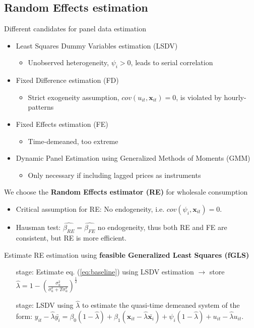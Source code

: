 \subsection{Random Effects estimation}
\label{subsec:e_re}
Different candidates for panel data estimation
\begin{itemize}
    \item Least Squares Dummy Variables estimation (LSDV)
    \begin{itemize}
        \item Unobserved heterogeneity, $\psi_i>0$, leads to serial correlation
    \end{itemize}
    \item Fixed Difference estimation (FD)
    \begin{itemize}
        \item Strict exogeneity assumption, $cov(u_{it},\bm{x}_{it})=0$, is violated by hourly-patterns
    \end{itemize}
    \item Fixed Effects estimation (FE)
    \begin{itemize}
        \item Time-demeaned, too extreme
    \end{itemize}
    \item Dynamic Panel Estimation using Generalized Methods of Moments (GMM)
    \begin{itemize}
        \item Only necessary if including lagged prices as instruments
    \end{itemize}
\end{itemize}
We choose the \textbf{Random Effects estimator (RE)} for wholesale consumption
\begin{itemize}
    \item Critical assumption for RE: No endogeneity, i.e. $cov(\psi_i,\bm{x}_{it})=0$.
    \item Hausman test: $\hat{\beta_{RE}}=\hat{\beta_{FE}}$ no endogeneity, thus both RE and FE are consistent, but RE is more efficient.
\end{itemize}
Estimate RE estimation using \textbf{feasible Generalized Least Squares (fGLS)}
\begin{itemize}
    \item[\nth{1} stage:] Estimate eq. (\ref{eq:baseline}) using LSDV estimation $\rightarrow$ store $\hat{\lambda}=1-\left(\frac{\sigma^2_u}{\sigma^2_u+T\sigma^2_\alpha}\right)^\frac{1}{2}$
    \item[\nth{2} stage:] LSDV using $\hat{\lambda}$ to estimate the quasi-time demeaned system of the form: $y_{it}-\hat{\lambda}\bar{y_i}=\beta_0(1-\hat{\lambda})+\beta_1(\bm{x}_{it}-\hat{\lambda}\bar{\bm{x}_i})+\psi_i(1-\hat{\lambda})+u_{it}-\hat{\lambda}u_{it}$.
\end{itemize}

